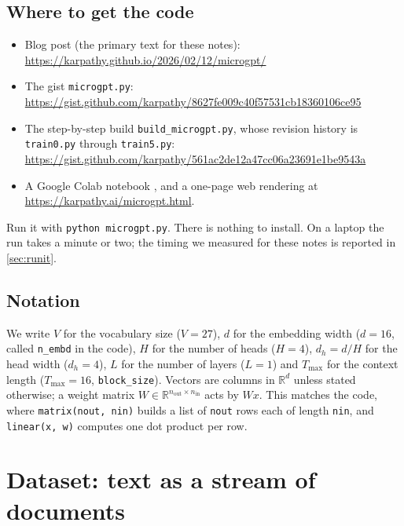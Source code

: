 \documentclass[11pt,letterpaper]{article}
\theoremstyle{remark}
\newcommand{\code}[1]{\lstinline[basicstyle=\ttfamily\small]|#1|}
\newcommand{\R}{\mathbb{R}}
\begin{document}
\subsection{Where to get the code}

\begin{itemize}[leftmargin=2em]
  \item Blog post (the primary text for these notes): \url{https://karpathy.github.io/2026/02/12/microgpt/}
  \item The gist \texttt{microgpt.py}: \url{https://gist.github.com/karpathy/8627fe009c40f57531cb18360106ce95}
  \item The step-by-step build \texttt{build\_microgpt.py}, whose revision history is \texttt{train0.py} through \texttt{train5.py}: \url{https://gist.github.com/karpathy/561ac2de12a47cc06a23691e1be9543a}
  \item A Google Colab notebook \parencite{karpathy2026microgptcolab}, and a one-page web rendering at \url{https://karpathy.ai/microgpt.html}.
\end{itemize}

Run it with \code{python microgpt.py}. There is nothing to install. On a laptop the run takes a minute or two; the timing we measured for these notes is reported in \cref{sec:runit}.

\subsection{Notation}

We write $V$ for the vocabulary size ($V=27$), $d$ for the embedding width ($d=16$, called \code{n_embd} in the code), $H$ for the number of heads ($H=4$), $d_h = d/H$ for the head width ($d_h=4$), $L$ for the number of layers ($L=1$) and $T_{\max}$ for the context length ($T_{\max}=16$, \code{block_size}). Vectors are columns in $\R^d$ unless stated otherwise; a weight matrix $W\in\R^{n_{\text{out}}\times n_{\text{in}}}$ acts by $W x$. This matches the code, where \code{matrix(nout, nin)} builds a list of \code{nout} rows each of length \code{nin}, and \code{linear(x, w)} computes one dot product per row.

\section{Dataset: text as a stream of documents}
\end{document}
